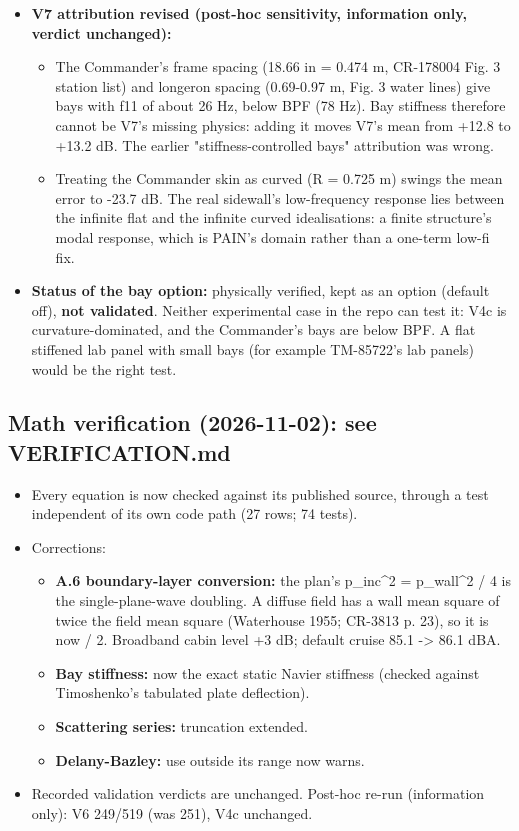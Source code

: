 \documentclass[10pt,a4paper]{article}
\begin{document}
\begin{itemize}
\begin{itemize}
\end{itemize}
\item \textbf{V7 attribution revised (post-hoc sensitivity, information only, verdict unchanged):}
\begin{itemize}
\item The Commander's frame spacing (18.66 in = 0.474 m, CR-178004 Fig. 3 station list) and longeron spacing (0.69-0.97 m, Fig. 3 water lines) give bays with f11 of about 26 Hz, below BPF (78 Hz). Bay stiffness therefore cannot be V7's missing physics: adding it moves V7's mean from +12.8 to +13.2 dB. The earlier "stiffness-controlled bays" attribution was wrong.
\item Treating the Commander skin as curved (R = 0.725 m) swings the mean error to -23.7 dB. The real sidewall's low-frequency response lies between the infinite flat and the infinite curved idealisations: a finite structure's modal response, which is PAIN's domain rather than a one-term low-fi fix.
\end{itemize}
\item \textbf{Status of the bay option:} physically verified, kept as an option (default off), \textbf{not validated}. Neither experimental case in the repo can test it: V4c is curvature-dominated, and the Commander's bays are below BPF. A flat stiffened lab panel with small bays (for example TM-85722's lab panels) would be the right test.
\end{itemize}

\subsection*{Math verification (2026-11-02): see VERIFICATION.md}

\begin{itemize}
\item Every equation is now checked against its published source, through a test independent of its own code path (27 rows; 74 tests).
\item Corrections:
\begin{itemize}
\item \textbf{A.6 boundary-layer conversion:} the plan's p\_inc\textasciicircum{}2 = p\_wall\textasciicircum{}2 / 4 is the single-plane-wave doubling. A diffuse field has a wall mean square of twice the field mean square (Waterhouse 1955; CR-3813 p. 23), so it is now / 2. Broadband cabin level +3 dB; default cruise 85.1 -> 86.1 dBA.
\item \textbf{Bay stiffness:} now the exact static Navier stiffness (checked against Timoshenko's tabulated plate deflection).
\item \textbf{Scattering series:} truncation extended.
\item \textbf{Delany-Bazley:} use outside its range now warns.
\end{itemize}
\item Recorded validation verdicts are unchanged. Post-hoc re-run (information only): V6 249/519 (was 251), V4c unchanged.
\end{itemize}
\end{document}
